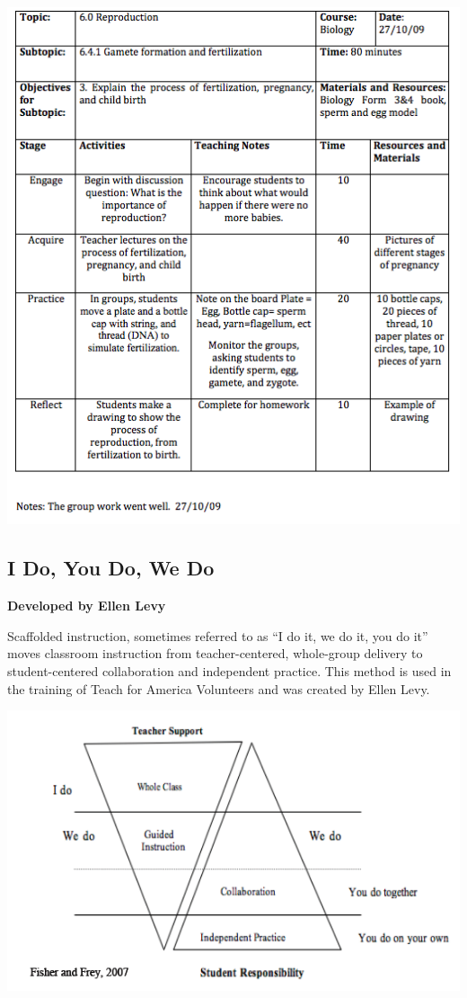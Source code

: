 \begin{center}
\includegraphics[scale=1]{./img/picture-5.png} 
\end{center}

\newpage
\begin{center}
\section{I Do, You Do, We Do}
\textbf{Developed by Ellen Levy}\\
\end{center}

Scaffolded instruction, sometimes referred to as ``I do it, we do it, you do it'' moves classroom instruction from teacher-centered, whole-group delivery to student-centered collaboration and independent practice.  This method is used in the training of Teach for America Volunteers and was created by Ellen Levy. \\

\begin{center}
\includegraphics[scale=0.7]{./img/i-do-you-do-triangle.png} 
\end{center}

